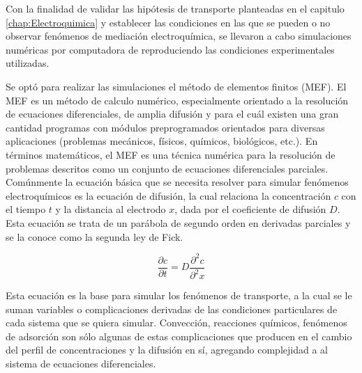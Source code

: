 	 	 Con la finalidad de validar las hipótesis de transporte planteadas en el capitulo \ref{chap:Electroquimica} y establecer las condiciones en las que se pueden o no observar fenómenos de mediación electroquímica, se llevaron a cabo simulaciones numéricas por computadora de reproduciendo las condiciones experimentales utilizadas.

	 	 Se optó para realizar las simulaciones el método de elementos finitos (MEF). El MEF es un método de calculo numérico, especialmente orientado a la resolución de ecuaciones diferenciales, de amplia difusión y para el cuál existen una gran cantidad programas con módulos preprogramados orientados para diversas aplicaciones (problemas mecánicos, físicos, químicos, biológicos, etc.). En términos matemáticos, el MEF es una técnica numérica para la resolución de problemas descritos como un conjunto de ecuaciones diferenciales parciales. Comúnmente la ecuación básica que se necesita resolver para simular fenómenos electroquímicos es la ecuación de difusión, la cual relaciona la concentración $c$ con el tiempo $t$ y la distancia al electrodo $x$, dada por el coeficiente de difusión $D$.\cite{Britz2005,Nann2003} Esta ecuación se trata de un parábola de segundo orden en derivadas parciales y se la conoce como la segunda ley de Fick.\cite{fick1855}

	 	 \begin{equation}
	 	 	\frac{\partial c}{\partial t}=D\frac{\partial^2 c}{\partial^2 x}
	 	 	\label{eq:fick}
	 	 \end{equation}

	 	 Esta ecuación es la base para simular los fenómenos de transporte, a la cual se le suman variables o complicaciones derivadas de las condiciones particulares de cada sistema que se quiera simular. Convección, reacciones químicos, fenómenos de adsorción son sólo algunas de estas complicaciones que producen en el cambio del perfil de concentraciones y la difusión en sí, agregando complejidad a al sistema de ecuaciones diferenciales.  

